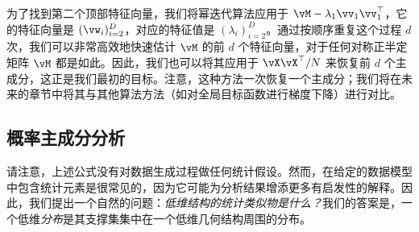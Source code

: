 \documentclass[../../book-main.tex]{subfiles}
\begin{document}

为了找到第二个顶部特征向量，我们将幂迭代算法应用于 \(\vM - \lambda_{1}\vv_{1}\vv_{1}^{\top}\)，它的特征向量是 \((\vw_{i})_{i = 2}^{D}\)，对应的特征值是 \((\lambda_{i})_{i = 2}^{D}\)。通过按顺序重复这个过程 \(d\) 次，我们可以非常高效地快速估计 \(\vM\) 的前 \(d\) 个特征向量，对于任何对称正半定矩阵 \(\vM\) 都是如此。因此，我们也可以将其应用于 \(\vX\vX^{\top}/N\) 来恢复前 \(d\) 个主成分，这正是我们最初的目标。注意，这种方法一次恢复一个主成分；我们将在未来的章节中将其与其他算法方法（如对全局目标函数进行梯度下降）进行对比。





\subsection{概率主成分分析}\label{subsec:probabilistic PCA}

请注意，上述公式没有对数据生成过程做任何统计假设。然而，在给定的数据模型中包含统计元素是很常见的，因为它可能为分析结果增添更多有启发性的解释。因此，我们提出一个自然的问题：\textit{低维结构的统计类似物是什么？}我们的答案是，一个低维\textit{分布}是其支撑集集中在一个低维几何结构周围的分布。
\end{document}
